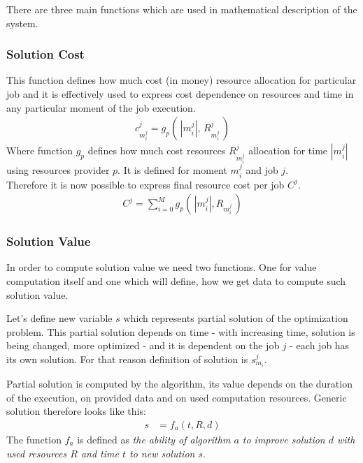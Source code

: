 There are three main functions which are used in mathematical description of the system.

\subsubsection{Solution Cost}
This function defines how much cost (in money) resource allocation for particular job
and it is effectively used to express cost dependence on resources and time in any particular moment of the job execution.
\begin{align*}
    c_{m_{i}^{j}}^{j} = g_{p} (\, |m_{i}^{j}|,\, R_{m_{i}^{j}}^{j} \,)
\end{align*}
Where function $g_{p}$ defines how much cost resources $R_{m_{i}^{j}}^{j}$ allocation for time $|m_{i}^{j}|$ using resources provider $p$.
It is defined for moment $m_{i}^{j}$ and job $j$.\\
Therefore it is now possible to express final resource cost per job $C^{j}$.
\begin{align*}
    C^{j} = \sum_{i = 0}^{M} g_{p} (\, |m_{i}^{j}|, R_{m_{i}^{j}} \,)
\end{align*}

\subsubsection{Solution Value}
In order to compute solution value we need two functions.
One for value computation itself and one which will define,
how we get data to compute such solution value.

Let's define new variable $s$ which represents partial solution of the optimization problem.
This partial solution depends on time - with increasing time, solution is being changed, more optimized -
and it is dependent on the job $j$ - each job has its own solution.
For that reason definition of solution is $s_{m_{i}}^{j}$.

Partial solution is computed by the algorithm,
its value depends on the duration of the execution,
on provided data and on used computation resources.
Generic solution therefore looks like this:
\begin{align*}
    s &= f_a(t, R, d)
\end{align*}
The function $f_{a}$ is defined as \textit{the ability of algorithm $a$ to improve solution $d$ with used resources $R$ and time $t$ to new solution $s$}.


